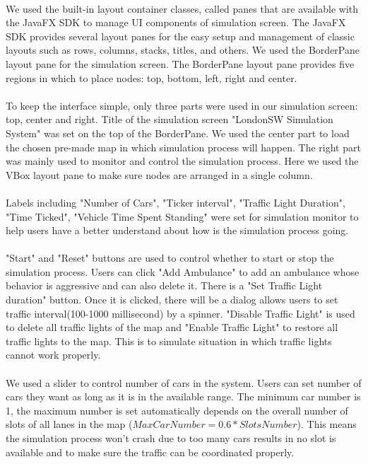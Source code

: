 \documentclass[a4paper,11pt,titlepage]{article}
\begin{document}
\paragraph{}
We used the built-in layout container classes, called panes that are available with the JavaFX SDK to manage UI components of simulation screen. The JavaFX SDK provides several layout panes for the easy setup and management of classic layouts such as rows, columns, stacks, titles, and others. We used the BorderPane layout pane for the simulation screen. The BorderPane layout pane provides five regions in which to place nodes: top, bottom, left, right and center. 
\paragraph{}
To keep the interface simple, only three parts were used in our simulation screen: top, center and right. Title of the simulation screen "LondonSW Simulation System" was set on the top of the BorderPane. We used the center part to load the chosen pre-made map in which simulation process will happen. The right part was mainly used to monitor and control the simulation process. Here we used the VBox layout pane to make sure nodes are arranged in a single column. 
\paragraph{}
Labels including "Number of Cars", "Ticker interval", "Traffic Light Duration", "Time Ticked", "Vehicle Time Spent Standing" were set for simulation monitor to help users have a better understand about how is the simulation process going. 
\paragraph{}
"Start" and "Reset" buttons are used to control whether to start or stop the simulation process. Users can click "Add Ambulance" to add an ambulance whose behavior is aggressive and can also delete it. There is a "Set Traffic Light duration" button. Once it is clicked, there will be a dialog allows users to set traffic interval(100-1000 millisecond) by a spinner. "Disable Traffic Light" is used to delete all traffic lights of the map and "Enable Traffic Light" to restore all traffic lights to the map. This is to simulate situation in which traffic lights cannot work properly. 
\paragraph{}
We used a slider to control number of cars in the system. Users can set number of cars they want as long as it is in the available range. The minimum car number is 1, the maximum number is set automatically depends on the overall number of slots of all lanes in the map ($MaxCarNumber=0.6*SlotsNumber$). This means the simulation process won't crash due to too many cars results in no slot is available and to make sure the traffic can be coordinated properly. 
\end{document}
